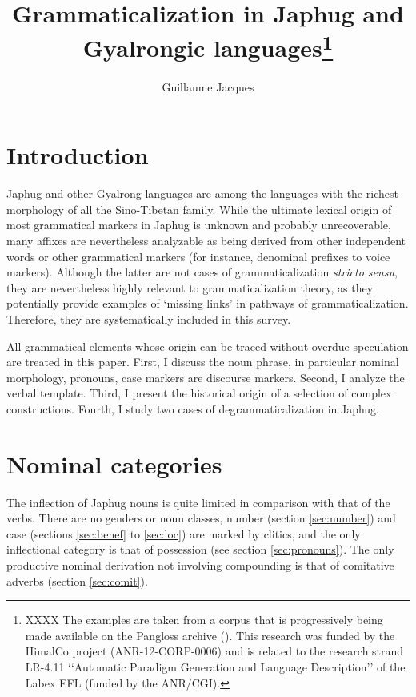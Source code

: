 \documentclass[oldfontcommands,oneside,a4paper,11pt]{article}
\begin{document}
 
 \title{Grammaticalization in Japhug and Gyalrongic languages\footnote{XXXX The examples are taken from a corpus that is progressively being made available on the Pangloss archive (\citealt{michailovsky14pangloss}). This research was funded by the HimalCo project (ANR-12-CORP-0006) and is related to the research strand LR-4.11 ‘‘Automatic Paradigm Generation and Language Description’’ of the Labex EFL (funded by the ANR/CGI).}}
 \author{Guillaume Jacques}
 \maketitle  
 \section{Introduction}
Japhug and other Gyalrong languages are among the languages with the richest morphology of all the Sino-Tibetan family. While the ultimate lexical origin of most grammatical markers in Japhug is unknown and probably unrecoverable, many affixes are nevertheless analyzable as being derived from other independent words or other grammatical markers (for instance, denominal prefixes to voice markers). Although the latter are not cases of grammaticalization \textit{stricto sensu}, they are nevertheless  highly relevant to grammaticalization theory, as they potentially provide examples of `missing links' in pathways of grammaticalization. Therefore, they are systematically included in this survey.

All grammatical elements whose origin can be traced without overdue speculation are treated in this paper. First, I discuss the noun phrase, in particular nominal morphology, pronouns, case markers are discourse markers. Second, I analyze the verbal template. Third, I present the historical origin of a selection of complex constructions. Fourth, I study two cases of degrammaticalization in Japhug.

 \section{Nominal categories} 
 
The inflection of Japhug nouns is quite limited in comparison with that of the verbs. There are no genders or noun classes, number (section \ref{sec:number}) and case (sections \ref{sec:benef} to \ref{sec:loc}) are marked by clitics, and the only inflectional category is that of possession (see section \ref{sec:pronouns}).  The only productive nominal derivation not involving compounding is that of comitative adverbs (section \ref{sec:comit}).
\end{document}
